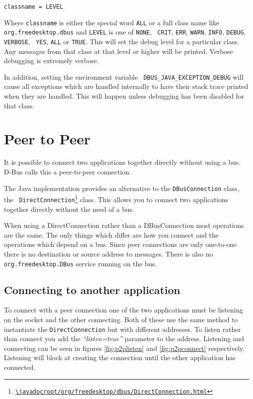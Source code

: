 \documentclass[a4paper,12pt]{article}
\begin{document}
\begin{verbatim}
classname = LEVEL
\end{verbatim}

Where {\tt classname} is either the special word {\tt ALL} or a full class name
like {\tt org.freedesktop.dbus} and {\tt LEVEL} is one of {\tt NONE}, {\tt
CRIT}, {\tt ERR}, {\tt WARN}, {\tt INFO}, {\tt DEBUG}, {\tt VERBOSE}, {\tt
YES}, {\tt ALL} or {\tt TRUE}. This will set the debug level for a particular
class. Any messages from that class at that level or higher will be printed.
Verbose debugging is extremely verbose.

In addition, setting the environment variable {\tt
DBUS\_JAVA\_EXCEPTION\_DEBUG} will cause all exceptions which are handled
internally to have their stack trace printed when they are handled. This will
happen unless debugging has been disabled for that class.

\section{Peer to Peer}

It is possible to connect two applications together directly without using a
bus. D-Bus calls this a peer-to-peer connection.

The Java implementation provides an alternative to the {\tt DBusConnection}
class, the {\tt
DirectConnection\footnote{\url{\javadocroot/org/freedesktop/dbus/DirectConnection.html}}}
class. This allows you to connect two applications together directly without
the need of a bus.

When using a DirectConnection rather than a DBusConnection most operations are
the same. The only things which differ are how you connect and the operations
which depend on a bus. Since peer connections are only one-to-one there is no
destination or source address to messages. There is also no {\tt
org.freedesktop.DBus} service running on the bus.

\subsection{Connecting to another application}

To connect with a peer connection one of the two applications must be listening
on the socket and the other connecting. Both of these use the same method to
instantiate the {\tt DirectConnection} but with different addresses. To listen
rather than connect you add the {\em ``listen=true''} parameter to the address.
Listening and connecting can be seen in figures \ref{fig:p2plisten} and
\ref{fig:p2pconnect} respectively. Listening will block at creating the
connection until the other application has connected.
\end{document}
